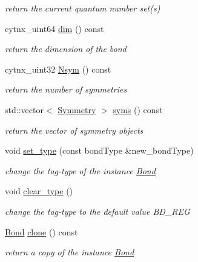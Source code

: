 \begin{DoxyCompactItemize}
\begin{DoxyCompactList}\small\item\em return the current quantum number set(s) \end{DoxyCompactList}\item 
cytnx\+\_\+uint64 \hyperlink{classcytnx_1_1Bond_aa072647e03a4c797479445bd41b9eacf}{dim} () const
\begin{DoxyCompactList}\small\item\em return the dimension of the bond \end{DoxyCompactList}\item 
cytnx\+\_\+uint32 \hyperlink{classcytnx_1_1Bond_acd46a218add6a88c1cc9035b06adb7b6}{Nsym} () const
\begin{DoxyCompactList}\small\item\em return the number of symmetries \end{DoxyCompactList}\item 
std\+::vector$<$ \hyperlink{classcytnx_1_1Symmetry}{Symmetry} $>$ \hyperlink{classcytnx_1_1Bond_ad0adf7b134654f0390e98695ba4d416e}{syms} () const
\begin{DoxyCompactList}\small\item\em return the vector of symmetry objects \end{DoxyCompactList}\item 
void \hyperlink{classcytnx_1_1Bond_ae6957c3902bf12fd27ab881db3fe5243}{set\+\_\+type} (const bond\+Type \&new\+\_\+bond\+Type)
\begin{DoxyCompactList}\small\item\em change the tag-\/type of the instance \hyperlink{classcytnx_1_1Bond}{Bond} \end{DoxyCompactList}\item 
\mbox{\label{classcytnx_1_1Bond_a6272e30153df85944fc98bf5419dc1c8}} 
void \hyperlink{classcytnx_1_1Bond_a6272e30153df85944fc98bf5419dc1c8}{clear\+\_\+type} ()
\begin{DoxyCompactList}\small\item\em change the tag-\/type to the default value B\+D\+\_\+\+R\+EG \end{DoxyCompactList}\item 
\hyperlink{classcytnx_1_1Bond}{Bond} \hyperlink{classcytnx_1_1Bond_a8c4d6443ffe7c3f3ecd8c474fd9a18eb}{clone} () const
\begin{DoxyCompactList}\small\item\em return a copy of the instance \hyperlink{classcytnx_1_1Bond}{Bond} \end{DoxyCompactList}\item 

\end{DoxyCompactItemize}
